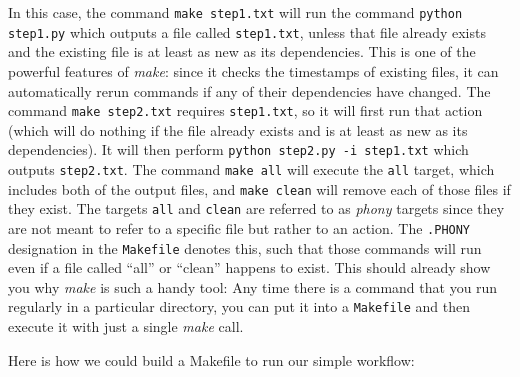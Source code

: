 In this case, the command \texttt{make step1.txt} will run the command \texttt{python step1.py} which outputs a file called \texttt{step1.txt}, unless that file already exists and the existing file is at least as new as its dependencies.  This is one of the powerful features of \textit{make}: since it checks the timestamps of existing files, it can automatically rerun commands if any of their dependencies have changed.  The command \texttt{make step2.txt} requires \texttt{step1.txt}, so it will first run that action (which will do nothing if the file already exists and is at least as new as its dependencies).  It will then perform \texttt{python step2.py -i step1.txt} which outputs \texttt{step2.txt}.  The command \texttt{make all} will execute the \texttt{all} target, which includes both of the output files, and \texttt{make clean} will remove each of those files if they exist.  The targets \texttt{all} and \texttt{clean} are referred to as \textit{phony} targets since they are not meant to refer to a specific file but rather to an action. The \texttt{.PHONY} designation in the \texttt{Makefile} denotes this, such that those commands will run even if a file called ``all'' or ``clean'' happens to exist.  This should already show you why \textit{make} is such a handy tool: Any time there is a command that you run regularly in a particular directory, you can put it into a \texttt{Makefile} and then execute it with just a single \textit{make} call.

Here is how we could build a Makefile to run our simple workflow:

